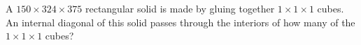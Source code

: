 A $150\times 324\times 375$ rectangular solid is made by gluing together $1\times 1\times 1$ cubes.  An internal diagonal of this solid passes through the interiors of how many of the $1\times 1\times 1$ cubes?